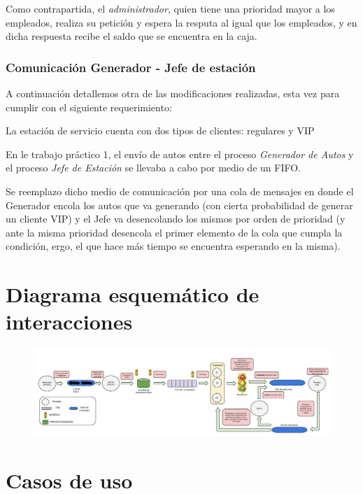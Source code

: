 \documentclass[12pt,a4paper,spanish]{article}
\begin{document}
	Como contrapartida, el \emph{administrador}, quien tiene una prioridad mayor a los empleados, realiza su
	petición y espera la resputa al igual que los empleados, y en dicha respuesta recibe el saldo que se 
	encuentra en la caja.

	\subsubsection{Comunicación Generador - Jefe de estación}

	A continuación detallemos otra de las modificaciones realizadas, esta vez para cumplir con el siguiente requerimiento:
	
	\begin{framed}
	La estación de servicio cuenta con dos tipos de clientes: regulares y VIP
	\end{framed}

	En le trabajo práctico 1, el envío de autos entre el proceso \emph{Generador de Autos} y el proceso \emph{Jefe de Estación}
	se llevaba a cabo por medio de un FIFO. 

	Se reemplazo dicho medio de comunicación por una cola de mensajes en donde el Generador encola los autos que va generando 
	(con cierta probabilidad de generar un cliente VIP) y el Jefe va desencolando los mismos por orden de prioridad (y ante la misma prioridad desencola el primer elemento de la cola que cumpla la condición, ergo, el que hace más tiempo se encuentra 
	esperando en la misma).

	\newpage
	\section{Diagrama esquemático de interacciones}
	
	\begin{figure}[h]
	\includegraphics[angle=90, scale = 0.27]{esquema_2.png}
	\centering
	\end{figure}

	\newpage
	\section{Casos de uso}
\end{document}

